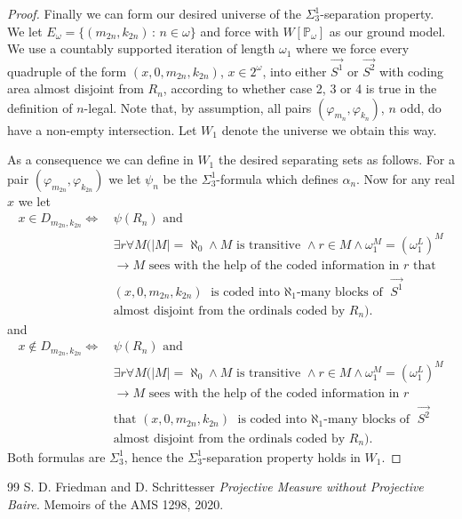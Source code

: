 \documentclass[10pt,a4paper]{amsart}
\newcommand{\forceP}{\mathbb{P}}
\begin{document}
\begin{proof}
Finally we can form our desired universe of the $\Sigma^1_3$-separation property. We let $E_{\omega} = \{(m_{2n},k_{2n}) \,: \, n \in \omega\}$ and force with $W[\forceP_{\omega}]$ as our ground model.  We use a countably supported iteration of length $\omega_1$ where we force every quadruple of the form $(x,0,m_{2n},k_{2n})$, $x \in 2^{\omega}$, into either $\vec{S^1}$ or $\vec{S^2}$ with coding area almost disjoint from $ R_{n}$, according to whether case 2, 3 or 4 is true in the definition of $n$-legal. Note that, by assumption, all pairs $(\varphi_{m_n}, \varphi_{k_n})$, $n$ odd, do have a non-empty intersection.  Let $W_1$ denote the universe we obtain this way.

As a consequence we can define in $W_1$ the desired separating sets as follows.
For a pair $(\varphi_{m_{2n}},\varphi_{k_{2n}})$ we let $\psi_{n}$ be the $\Sigma^1_3$-formula which defines $\alpha_{n}$. Now for any real $x$  we let 
\begin{align*}
x \in D_{m_{2n},k_{2n}} \Leftrightarrow \, &\psi(R_{n}) \text{ and } \\& \exists r \forall M (|M|=\aleph_0 \land M \text{ is transitive } \land r \in M \land \omega_1^M=(\omega_1^L)^M  \\&\rightarrow M \text{ sees with the help of the coded information in } r \text{ that }\\& (x,0,m_{2n},k_{2n})  \text{ is coded into $\aleph_1$-many blocks of } \vec{S^1} \\& \text{almost disjoint from the ordinals coded by }  R_{n}).
\end{align*}
and
\begin{align*}
x \notin D_{m_{2n},k_{2n}} \Leftrightarrow \, &\psi(R_{n}) \text{ and } \\& \exists r \forall M (|M|=\aleph_0 \land M \text{ is transitive } \land r \in M \land \omega_1^M=(\omega_1^L)^M  \\&\rightarrow M \text{ sees with the help of the coded information in } r \\& \text{that } (x,0,m_{2n},k_{2n})  \text{ is coded into $\aleph_1$-many blocks of } \vec{S^2} \\&\text{almost disjoint from the ordinals coded by }  R_{n}).
\end{align*}
Both formulas are $\Sigma^1_3$, hence the $\Sigma^1_3$-separation property holds in $W_1$.

\end{proof}


\begin{thebibliography}{99}
S. D. Friedman and D. Schrittesser \textit{Projective Measure without Projective Baire}. Memoirs of the AMS 1298, 2020.
\end{thebibliography}
\end{document}

